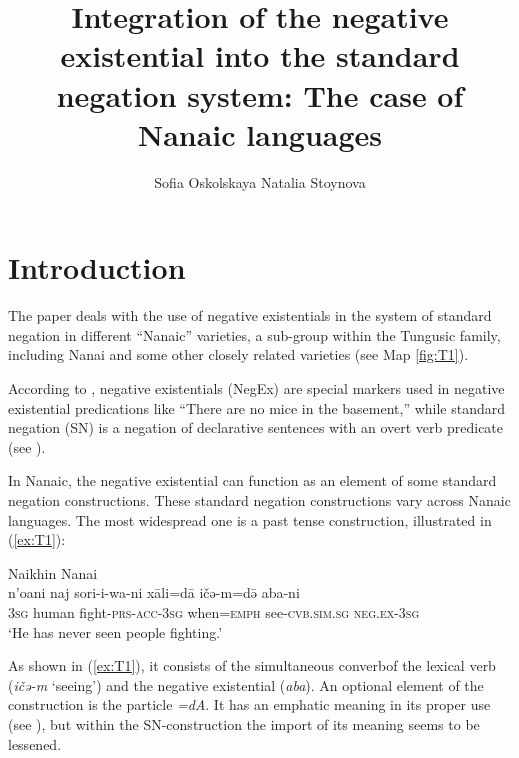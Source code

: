 \documentclass[output=paper]{langscibook}
\author{Sofia Oskolskaya \affiliation{Institute for Linguistic Studies, RAS} \lastand Natalia Stoynova \affiliation{Russian Language Institute, RAS \& NRU Higher School of Economics}}
\title{Integration of the negative existential into the standard negation system: The case of Nanaic languages}
\begin{document}
\maketitle

\section{Introduction}\label{sec:T1}

The paper deals with the use of negative existentials in the system of standard negation in different “Nanaic” varieties, a sub-group within the Tungusic family, including Nanai and some other closely related varieties (see Map \ref{fig:T1}).

According to \citet[107]{Veselinova2013}, negative existentials (NegEx) are special markers used in negative existential predications like “There are no mice in the basement,” while standard negation (SN) is a negation of declarative sentences with an overt verb predicate (see \citealp[39–45]{Miestamo2005}).

In Nanaic, the negative existential can function as an element of some standard negation constructions. These standard negation constructions vary across Nanaic languages. The most widespread one is a past tense construction, illustrated in (\ref{ex:T1}):

\ea Naikhin Nanai \label{ex:T1}\\
	\gll n’oani	naj	sori-i-wa-ni	xāli=dā	ičə-m=də̄	aba-ni\\
	\textsc{3sg}	human	fight-\textsc{prs-acc-3sg}	when=\textsc{emph}	see-\textsc{cvb.sim.sg}	\textsc{neg.ex-3sg}\\
	\glt `He has never seen people fighting.' \citep[154, text]{avrorin1986a}
\z

As shown in (\ref{ex:T1}), it consists of the simultaneous converb\footnotemark of the lexical verb (\textit{ičə-m} ‘seeing’) and the negative existential (\textit{aba}). An optional element of the construction is the particle \textit{=dA}. It has an emphatic meaning in its proper use (see \citealp[264]{avrorin1961a}), but within the SN-construction the import of its meaning seems to be lessened.
\end{document}
